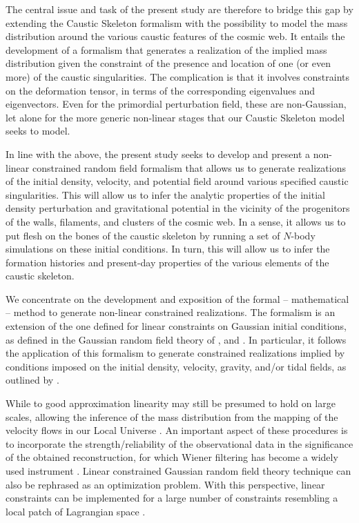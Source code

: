 \documentclass[a4paper, 11pt]{article}
\begin{document}
The central issue and task of the present study are therefore to bridge this gap by extending the Caustic Skeleton formalism with the possibility to model the mass distribution around the various caustic features of the cosmic web. It entails the development of a formalism that generates a realization of the implied mass distribution given the constraint of the presence and location of one (or even more) of the caustic singularities. The complication is that it involves constraints on the deformation tensor, in terms of the corresponding eigenvalues and eigenvectors. Even for the primordial perturbation field, these are non-Gaussian, let alone for the more generic non-linear stages that our Caustic Skeleton model seeks to model.

\bigskip
In line with the above, the present study seeks to develop and present a non-linear constrained random field formalism that allows us to generate realizations of the initial density, velocity, and potential field around various specified caustic singularities. This will allow us to infer the analytic properties of the initial density perturbation and gravitational potential in the vicinity of the progenitors of the walls, filaments, and clusters of the cosmic web. In a sense, it allows us to put flesh on the bones of the caustic skeleton by running a set of $N$-body simulations on these initial conditions. In turn, this will allow us to infer the formation histories and present-day properties of the various elements of the caustic skeleton. 

We concentrate on the development and exposition of the formal -- mathematical -- method to generate non-linear constrained realizations. The formalism is an extension of the one defined for linear constraints on Gaussian initial conditions, as defined in the Gaussian random field theory of \cite{Bertschinger:1987}, \cite{Rybicki:1992} and \cite{Hoffman:1991}. In particular, it follows the application of this formalism to generate constrained realizations implied by conditions imposed on the initial density, velocity, gravity, and/or tidal fields, as outlined by \cite{Weygaert:1996} \cite[also see][]{Weygaert:1993,Haarlem:1993}.

\bigskip
While to good approximation linearity may still be presumed to hold on large scales, allowing the inference of the mass distribution from the mapping of the velocity flows in our Local Universe \cite{Bertschinger:1989,Dekel:1999,Courtois:2012,Hoffman:2015}. An important aspect of these procedures is to incorporate the strength/reliability of the observational data in the significance of the obtained reconstruction, for which Wiener filtering has become a widely used instrument \cite{Zaroubi:1995,Erdogdu:2004}. Linear constrained Gaussian random field theory technique can also be rephrased as an optimization problem. With this perspective, linear constraints can be implemented for a large number of constraints resembling a local patch of Lagrangian space \cite[see for example the splice method][]{Cadiou:2021}. 
\end{document}
